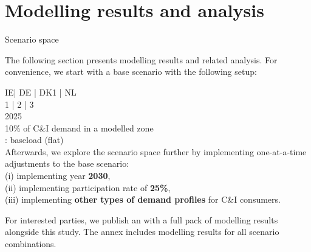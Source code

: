 \section{Modelling results and analysis}



\begin{frame}{Scenario space}

  {\small
  The following section presents modelling results and related analysis. 
  For convenience, we start with a \alert{base scenario} 
  with the following setup:

     IE| DE | DK1 | NL \\
     1 | 2 | 3 \\
     2025 \\ 
     10\% of C\&I demand in a modelled zone \\
    : baseload (flat) \\
  
  \vspace{0.3cm}
  Afterwards, we explore the scenario space further by implementing one-at-a-time 
  adjustments to the base scenario: \\
  (i) implementing year {\bf 2030}, \\
  (ii) implementing participation rate of {\bf 25\%}, \\ 
  (iii) implementing {\bf other types of demand profiles} for C\&I consumers.
  
  \vspace{0.3cm}
  For interested parties, we publish an  
  with a full pack of modelling results alongside this study. The annex 
  includes modelling results for all scenario combinations.
  }
  \end{frame}



